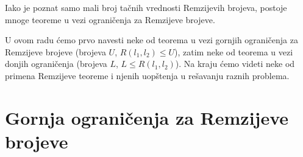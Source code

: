 \documentclass{article}
\theoremstyle{definition}
\newtheorem{teorema}{Teorema}[section]
\newcommand{\dokaz}[1]{\begin{proof}[Dokaz]#1\end{proof}}
\begin{document}
	
	
	Iako je poznat samo mali broj tačnih vrednosti Remzijevih brojeva, postoje mnoge teoreme u vezi ograničenja za Remzijeve brojeve. 
	
	U ovom radu ćemo prvo navesti neke od teorema u vezi gornjih ograničenja za Remzijeve brojeve (brojeva $U$, $R(l_1,l_2)\leq U$), zatim neke od teorema u vezi donjih ograničenja (brojeva $L$, $L \leq R(l_1,l_2)$). Na kraju ćemo videti neke od primena Remzijeve teoreme i njenih uopštenja u rešavanju raznih problema.
	
	
	
	\newpage
	\section{Gornja ograničenja za Remzijeve brojeve}

	
\end{document}
